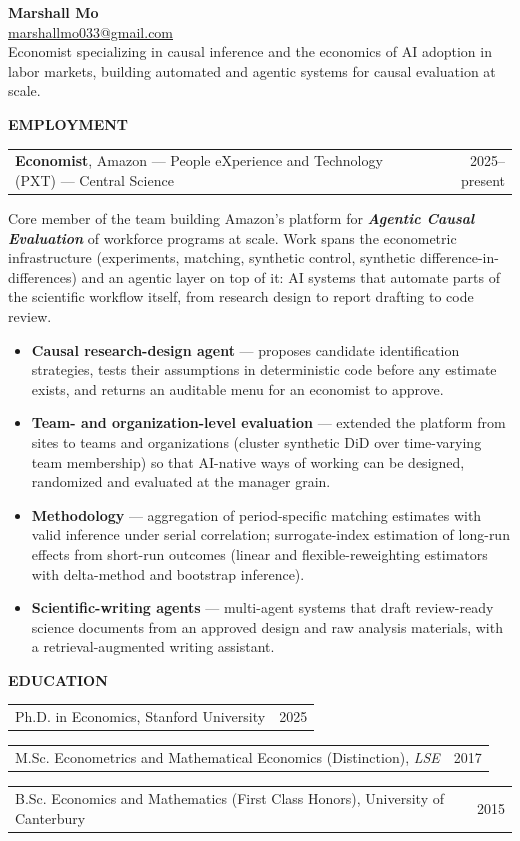 \documentclass[10pt]{article}
\makeatletter
\newcommand{\entry}[2]{%
  \noindent\begin{tabularx}{\textwidth}{@{}X r@{}} #1 & #2 \end{tabularx}\par
}
\newcommand{\sect}[1]{\vspace{1.25em}\textbf{\large #1}\par\vspace{1.0em}}
\makeatother
\begin{document}
\begin{center}
    {\LARGE \textbf{Marshall Mo}} \\
    \href{mailto:marshallmo033@gmail.com}{marshallmo033@gmail.com} \\[0.3em]
    \small Economist specializing in causal inference and the economics of AI adoption in labor markets, building automated and agentic systems for causal evaluation at scale.
\end{center}


\sect{EMPLOYMENT}
\entry{\textbf{Economist}, Amazon --- People eXperience and Technology (PXT) --- Central Science}{2025--present}

\vspace{0.3em}
Core member of the team building Amazon's platform for \textit{\textbf{Agentic Causal Evaluation}} of workforce programs at scale. Work spans the econometric infrastructure (experiments, matching, synthetic control, synthetic difference-in-differences) and an agentic layer on top of it: AI systems that automate parts of the scientific workflow itself, from research design to report drafting to code review.

\vspace{0.5em}
\begin{itemize}
\small
  \item \textbf{Causal research-design agent} --- proposes candidate identification strategies, tests their assumptions in deterministic code before any estimate exists, and returns an auditable menu for an economist to approve.
  \item \textbf{Team- and organization-level evaluation} --- extended the platform from sites to teams and organizations (cluster synthetic DiD over time-varying team membership) so that AI-native ways of working can be designed, randomized and evaluated at the manager grain.
  \item \textbf{Methodology} --- aggregation of period-specific matching estimates with valid inference under serial correlation; surrogate-index estimation of long-run effects from short-run outcomes (linear and flexible-reweighting estimators with delta-method and bootstrap inference).
  \item \textbf{Scientific-writing agents} --- multi-agent systems that draft review-ready science documents from an approved design and raw analysis materials, with a retrieval-augmented writing assistant.
\end{itemize}

\sect{EDUCATION}
\entry{Ph.D. in Economics, Stanford University}{2025}
\vspace{0.2em}
\entry{M.Sc. Econometrics and Mathematical Economics (Distinction), \textit{LSE}}{2017}
\vspace{0.2em}
\entry{B.Sc. Economics and Mathematics (First Class Honors), University of Canterbury}{2015}
\end{document}
